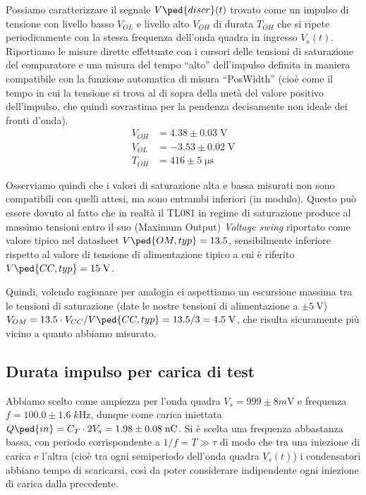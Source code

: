 \documentclass[10pt, a4paper, italian]{article}
\begin{document}
Possiamo caratterizzare il segnale $V\ped{discr} (t)$ trovato come un impulso
di tensione con livello basso $V_{OL}$ e livello alto $V_{OH}$ di durata
$T_{OH}$ che si ripete periodicamente con la stessa frequenza dell'onda quadra
in ingresso $V_s (t)$.
Riportiamo le misure dirette effettuate con i cursori
delle tensioni di saturazione del comparatore e una misura del tempo ``alto''
dell'impulso definita in maniera compatibile con la funzione automatica di
misura ``PosWidth'' (cioè come il tempo in cui la tensione si trova al di
sopra della metà del valore positivo dell'impulso, che quindi sovrastima
per la pendenza decisamente non ideale dei fronti d'onda).
\begin{align*}
V_{OH} &= 4.38 \pm 0.03 \; \si{\V} \\
V_{OL} &= -3.53 \pm 0.02 \; \si{\V} \\
T_{OH} &= 416 \pm 5 \; \si{\micro\s}
\end{align*}

Osserviamo quindi che i valori di saturazione alta e bassa misurati non sono
compatibili con quelli attesi, ma sono entrambi inferiori (in modulo). Questo
può essere dovuto al fatto che in realtà il TL081 in regime di saturazione
produce al massimo tensioni entro il suo (Maximum Output) \emph{Voltage swing}
riportato come valore tipico nel datasheet $V\ped{OM, typ} = 13.5$,
sensibilmente inferiore rispetto al valore di tensione di alimentazione tipico
a cui è riferito $V\ped{CC, typ} = 15 \; \si{\V}$.

Quindi, volendo ragionare per analogia ci aspettiamo un escursione massima tra
le tensioni di saturazione (date le nostre tensioni di alimentazione a
$\pm \SI{5}{\V}$) $V_{OM} = 13.5 \cdot V_{CC} / V\ped{CC, typ} =
13.5 /3 = 4.5 \; \si{\V}$, che risulta sicuramente più vicino a quanto
abbiamo misurato.

\subsection{Durata impulso per carica di test}
Abbiamo scelto come ampiezza per l'onda quadra $V_s = 999 \pm 8 \si{m\V}$ e
frequenza $f = 100.0 \pm 1.6 \; \si{k\Hz}$, dunque come carica
iniettata $Q\ped{in} = C_T \cdot 2 V_s = 1.98 \pm 0.08 \; \si{n\coulomb}$.
Si è scelta una frequenza abbastanza bassa, con periodo corrispondente a
$1/f = T \gg \tau$ di modo che tra una iniezione di carica e l'altra (cioè tra
ogni semiperiodo dell'onda quadra $V_s (t)$) i condensatori abbiano tempo di
scaricarsi, così da poter considerare indipendente ogni iniezione di carica
dalla precedente.
\end{document}
